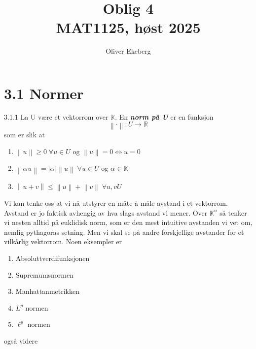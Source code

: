 \documentclass[a4paper,norsk]{article}
\title{Oblig 4 \\ MAT1125, høst 2025}
\author{Oliver Ekeberg}
\renewcommand{\geq}{\geqslant}
\renewcommand{\leq}{\leqslant}
\begin{document}
\maketitle

\tableofcontents

\section*{3.1 Normer}

\begin{definitionbox}{3.1.1}{}
La U være et vektorrom over $ \mathbb{K} $. En \textbf{\textit{norm på U}} er en funksjon
\[
    \left\lVert \cdot  \right\rVert : U \to \mathbb{R}
\]
som er slik at
\begin{enumerate}
    \item $ \left\lVert u \right\rVert \geq 0 \; \forall u \in U $ og $ \left\lVert u \right\rVert = 0 \iff u=0 $  
    \item $ \left\lVert \alpha_{}^{} u \right\rVert  = \left| \alpha_{}^{}  \right| \left\lVert u \right\rVert  \; \forall u \in U $ og $ \alpha_{}^{} \in  \mathbb{K} $  
    \item $ \left\lVert u + v \right\rVert \leq \left\lVert u \right\rVert + \left\lVert v \right\rVert \; \forall u, v  U $ 
\end{enumerate}
\end{definitionbox}

Vi kan tenke oss at vi nå utstyrer en måte å måle avstand i et vektorrom. Avstand er jo faktisk avhengig av hva slags avstand vi mener. Over $ \mathbb{K}^n $ så tenker vi nesten alltid på euklidisk norm, som er den mest intuitive avstanden vi vet om, nemlig pythagoras setning. Men vi skal se på andre forskjellige avstander for et vilkårlig vektorrom. 
Noen eksempler er
\begin{enumerate}
    \item Absoluttverdifunksjonen
    \item Supremumsnormen
    \item Manhattanmetrikken
    \item $ L^p $ normen
    \item $ \ell^p $ normen
\end{enumerate}
også videre
\end{document}
